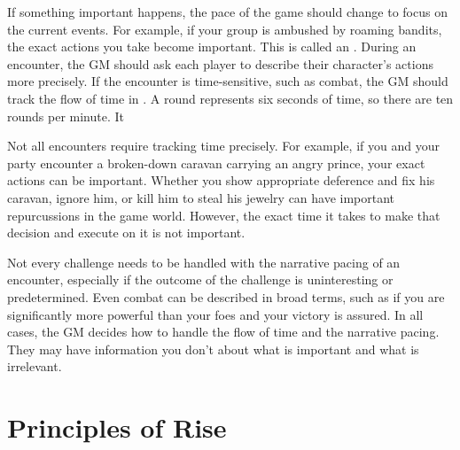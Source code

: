     If something important happens, the pace of the game should change to focus on the current events.
    For example, if your group is ambushed by roaming bandits, the exact actions you take become important.
    This is called an .
    During an encounter, the GM should ask each player to describe their character's actions more precisely.
    If the encounter is time-sensitive, such as combat, the GM should track the flow of time in .
    A round represents six seconds of time, so there are ten rounds per minute.
    It 

    Not all encounters require tracking time precisely.
    For example, if you and your party encounter a broken-down caravan carrying an angry prince, your exact actions can be important.
    Whether you show appropriate deference and fix his caravan, ignore him, or kill him to steal his jewelry can have important repurcussions in the game world.
    However, the exact time it takes to make that decision and execute on it is not important.

    Not every challenge needs to be handled with the narrative pacing of an encounter, especially if the outcome of the challenge is uninteresting or predetermined.
    Even combat can be described in broad terms, such as if you are significantly more powerful than your foes and your victory is assured.
    In all cases, the GM decides how to handle the flow of time and the narrative pacing.
    They may have information you don't about what is important and what is irrelevant.

\section{Principles of Rise}

